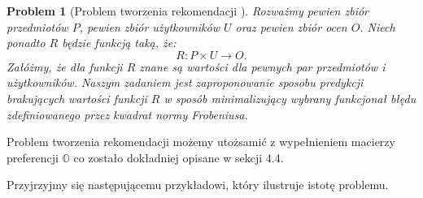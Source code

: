 \documentclass[12pt,a4paper]{report}
\newtheorem{problem}{Problem}[chapter]
\newcommand{\setUzytkownicy}{\mathit{U}}
\newcommand{\setPrzedmioty}{\mathit{P}}
\newcommand{\setOceny}{\mathit{O}}
\begin{document}
\begin{problem}[Problem tworzenia rekomendacji {\citep[Sec 1.3]{kidzinski}}]
Rozważmy pewien zbiór przedmiotów $\setPrzedmioty$, pewien zbiór użytkowników $\setUzytkownicy$ oraz pewien zbiór ocen $\setOceny$. Niech ponadto $R$ będzie funkcją taką, że:
$$ 
R: \setPrzedmioty \times \setUzytkownicy \to \setOceny .
$$
Załóżmy, że dla funkcji $R$ znane są wartości dla pewnych par przedmiotów i użytkowników. Naszym zadaniem jest zaproponowanie sposobu predykcji brakujących wartości funkcji $R$ w sposób minimalizujący wybrany funkcjonał błędu zdefiniowanego przez kwadrat normy Frobeniusa. 
\end{problem}

Problem tworzenia rekomendacji możemy utożsamić z wypełnieniem macierzy preferencji $\mathbb{O}$ co zostało dokładniej opisane w sekcji 4.4.

Przyjrzyjmy się następującemu przykładowi, który ilustruje istotę problemu.
\end{document}
